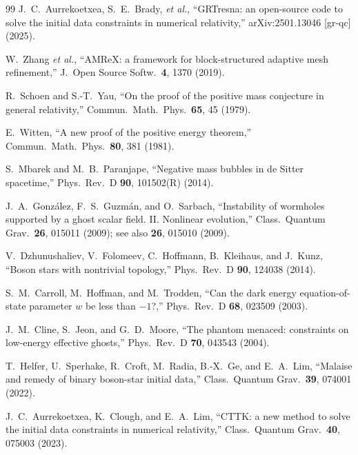 \documentclass[twocolumn,floatfix,aps,prd,superscriptaddress,nofootinbib]{revtex4-2}
\begin{document}
\begin{thebibliography}{99}
J.~C.~Aurrekoetxea, S.~E.~Brady, \emph{et al.},
\newblock ``GRTresna: an open-source code to solve the initial data constraints in numerical relativity,''
\newblock arXiv:2501.13046 [gr-qc] (2025).

W.~Zhang \emph{et al.},
\newblock ``AMReX: a framework for block-structured adaptive mesh refinement,''
\newblock J.\ Open Source Softw.\ \textbf{4}, 1370 (2019).

R.~Schoen and S.-T.~Yau,
\newblock ``On the proof of the positive mass conjecture in general relativity,''
\newblock Commun.\ Math.\ Phys.\ \textbf{65}, 45 (1979).

E.~Witten,
\newblock ``A new proof of the positive energy theorem,''
\newblock Commun.\ Math.\ Phys.\ \textbf{80}, 381 (1981).

S.~Mbarek and M.~B.~Paranjape,
\newblock ``Negative mass bubbles in de Sitter spacetime,''
\newblock Phys.\ Rev.\ D \textbf{90}, 101502(R) (2014).

J.~A.~Gonz\'alez, F.~S.~Guzm\'an, and O.~Sarbach,
\newblock ``Instability of wormholes supported by a ghost scalar field. II. Nonlinear evolution,''
\newblock Class.\ Quantum Grav.\ \textbf{26}, 015011 (2009); see also \textbf{26}, 015010 (2009).

V.~Dzhunushaliev, V.~Folomeev, C.~Hoffmann, B.~Kleihaus, and J.~Kunz,
\newblock ``Boson stars with nontrivial topology,''
\newblock Phys.\ Rev.\ D \textbf{90}, 124038 (2014).

S.~M.~Carroll, M.~Hoffman, and M.~Trodden,
\newblock ``Can the dark energy equation-of-state parameter $w$ be less than $-1$?,''
\newblock Phys.\ Rev.\ D \textbf{68}, 023509 (2003).

J.~M.~Cline, S.~Jeon, and G.~D.~Moore,
\newblock ``The phantom menaced: constraints on low-energy effective ghosts,''
\newblock Phys.\ Rev.\ D \textbf{70}, 043543 (2004).

T.~Helfer, U.~Sperhake, R.~Croft, M.~Radia, B.-X.~Ge, and E.~A.~Lim,
\newblock ``Malaise and remedy of binary boson-star initial data,''
\newblock Class.\ Quantum Grav.\ \textbf{39}, 074001 (2022).

J.~C.~Aurrekoetxea, K.~Clough, and E.~A.~Lim,
\newblock ``CTTK: a new method to solve the initial data constraints in numerical relativity,''
\newblock Class.\ Quantum Grav.\ \textbf{40}, 075003 (2023).


\end{thebibliography}
\end{document}
